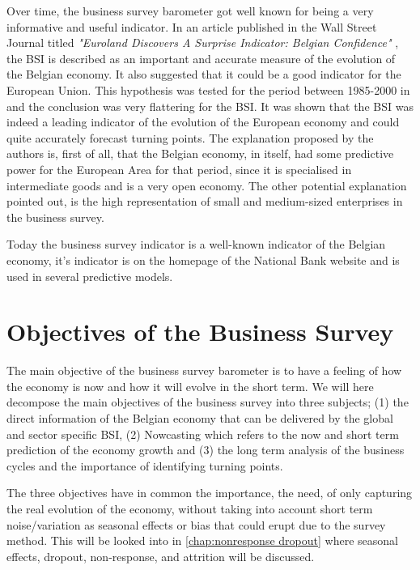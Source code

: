 \documentclass[12pt,a4paper,oneside]{book}
\begin{document}
Over time, the business survey barometer got well known for being a very informative and useful indicator. 
In an article published in the Wall Street Journal titled \textit{"Euroland Discovers A Surprise Indicator: Belgian Confidence"} \citep{rhoads_euroland_1999}, the BSI is described as an important and accurate measure of the evolution of the Belgian economy. 
It also suggested that it could be a good indicator for the European Union. 
This hypothesis was tested for the period between 1985-2000 in \cite{vanhaelen_belgian_2000} and the conclusion was very flattering for the BSI. 
It was shown that the BSI was indeed a leading indicator of the evolution of the European economy and could quite accurately forecast turning points. 
The explanation proposed by the authors is, first of all, that the Belgian economy, in itself, had some predictive power for the European Area for that period, since it is specialised in intermediate goods and is a very open economy. 
The other potential explanation pointed out, is the high representation of small and medium-sized enterprises in the business survey.

Today the business survey indicator is a well-known indicator of the Belgian economy, it's indicator is on the homepage of the National Bank website and is used in several predictive models.




\section{Objectives of the Business Survey}
\label{section:Objective}


The main objective of the business survey barometer is to have a feeling of how the economy is now and how it will evolve in the short term.
We will here decompose the main objectives of the business survey into three subjects; (1) the direct information of the Belgian economy that can be delivered by the global and sector specific BSI, (2) Nowcasting which refers to the now and short term prediction of the economy growth and (3) the long term analysis of the business cycles and the importance of identifying turning points.

The three objectives have in common the importance, the need,  of only capturing the real evolution of the economy, without taking into account short term noise/variation as seasonal effects or bias that could erupt due to the survey method.
This will be looked into in \autoref{chap:nonresponse dropout} where seasonal effects, dropout, non-response, and attrition will be discussed.
\end{document}

